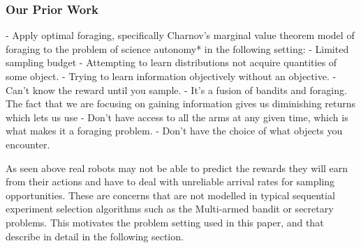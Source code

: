 \subsubsection{Our Prior Work}
		- Apply optimal foraging, specifically Charnov's marginal value theorem
		model of foraging to the problem of science autonomy* in the following setting:	
			- Limited sampling budget
			- Attempting to learn distributions not acquire quantities of some object.
			- Trying to learn information objectively without an objective. 
			- Can't know the reward until you sample.
			- It's a fusion of bandits and foraging.  The fact that we are focusing on gaining information gives us diminishing returns which lets us use 
			- Don't have access to all the arms at any given time, which is what makes it a foraging problem.
			- Don't have the choice of what objects you encounter.

As seen above real robots may not be able to predict the rewards they will earn from their actions and have to deal with unreliable arrival rates for sampling opportunities.  These are concerns that are not modelled in typical sequential experiment selection algorithms such as the Multi-armed bandit or secretary problems.  This motivates the problem setting used in this paper, and that describe in detail in the following section.
